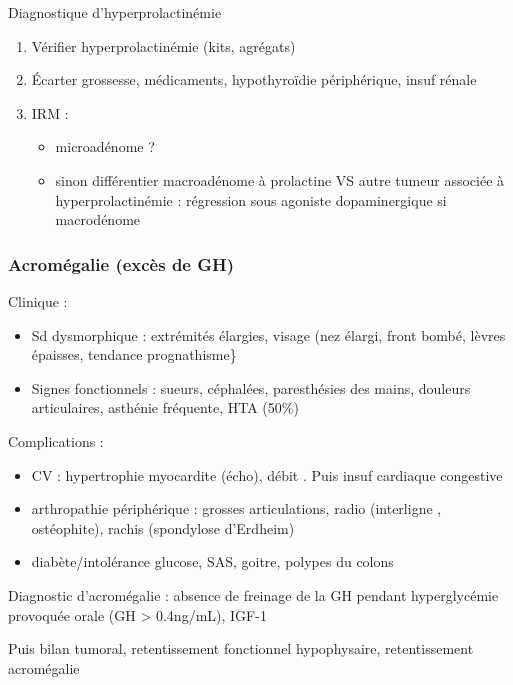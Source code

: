 \documentclass[11pt]{article}
\begin{document}
\begin{tcolorbox}
Diagnostique d'hyperprolactinémie
\begin{enumerate}
\item  Vérifier hyperprolactinémie (kits, agrégats)
\item  Écarter grossesse, médicaments, hypothyroïdie périphérique, insuf rénale
\item  IRM : 
\begin{itemize}
  \item microadénome ?
  \item sinon différentier macroadénome à prolactine VS autre tumeur associée à 
hyperprolactinémie : régression sous agoniste dopaminergique si macrodénome
\end{itemize}
\end{enumerate}
\end{tcolorbox}

\subsubsection{Acromégalie (excès de \gls{GH})}
\label{sec:org6563967}
Clinique :
\begin{itemize}
\item Sd dysmorphique : extrémités élargies, visage (nez élargi, front bombé, lèvres épaisses, tendance prognathisme\}
\item Signes fonctionnels : sueurs, céphalées, paresthésies des mains, douleurs articulaires, asthénie fréquente, HTA (50\%)
\end{itemize}

Complications :
\begin{itemize}
\item CV : hypertrophie myocardite (écho), débit \inc. Puis insuf cardiaque
congestive
\item arthropathie périphérique : grosses articulations, radio (interligne \inc,
ostéophite), rachis (spondylose d'Erdheim)
\item diabète/intolérance glucose, SAS, goitre, polypes du colons
\end{itemize}

\begin{tcolorbox}
Diagnostic d'acromégalie : absence de freinage de la GH pendant hyperglycémie provoquée
  orale (GH > 0.4ng/mL), \inc IGF-1\footnotemark
\end{tcolorbox}

Puis bilan tumoral, retentissement fonctionnel hypophysaire, retentissement
acromégalie
\end{document}
